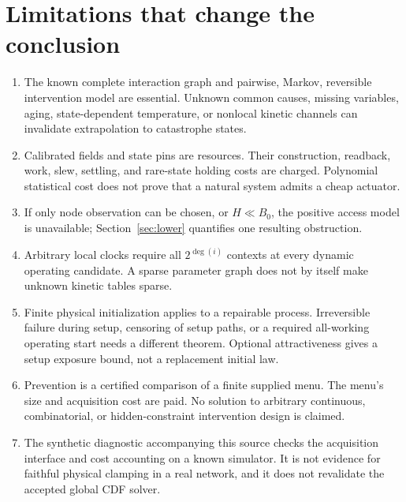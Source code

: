 \documentclass[11pt]{article}
\begin{document}
\section{Limitations that change the conclusion}
\begin{enumerate}
\item The known complete interaction graph and pairwise, Markov, reversible intervention model are essential. Unknown common causes, missing variables, aging, state-dependent temperature, or nonlocal kinetic channels can invalidate extrapolation to catastrophe states.
\item Calibrated fields and state pins are resources. Their construction, readback, work, slew, settling, and rare-state holding costs are charged. Polynomial statistical cost does not prove that a natural system admits a cheap actuator.
\item If only node observation can be chosen, or $H\ll B_0$, the positive access model is unavailable; Section~\ref{sec:lower} quantifies one resulting obstruction.
\item Arbitrary local clocks require all $2^{\deg(i)}$ contexts at every dynamic operating candidate. A sparse parameter graph does not by itself make unknown kinetic tables sparse.
\item Finite physical initialization applies to a repairable process. Irreversible failure during setup, censoring of setup paths, or a required all-working operating start needs a different theorem. Optional attractiveness gives a setup exposure bound, not a replacement initial law.
\item Prevention is a certified comparison of a finite supplied menu. The menu's size and acquisition cost are paid. No solution to arbitrary continuous, combinatorial, or hidden-constraint intervention design is claimed.
\item The synthetic diagnostic accompanying this source checks the acquisition interface and cost accounting on a known simulator. It is not evidence for faithful physical clamping in a real network, and it does not revalidate the accepted global CDF solver.
\end{enumerate}
\end{document}
